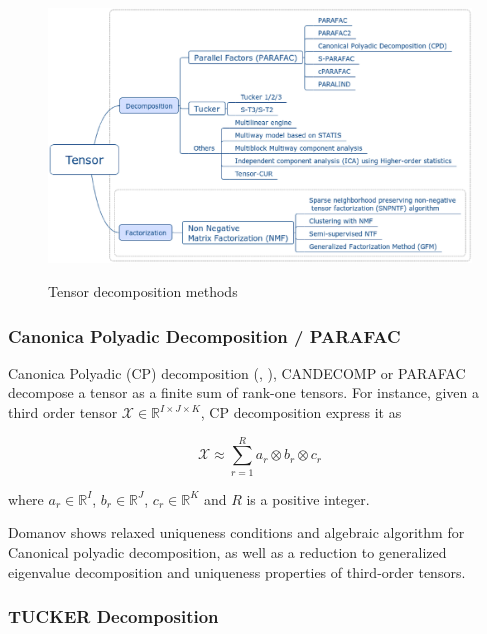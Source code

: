 \documentclass[letterpaper,12pt]{article}
\begin{document}
\begin{figure}[!ht]
\centering
 \includegraphics[scale=0.5]{Images/tensor_decomposition_methods.eps}\label{fig:methods}
 \caption{Tensor decomposition methods}
\end{figure}

\subsubsection{Canonica Polyadic Decomposition / PARAFAC}

Canonica Polyadic (CP) decomposition (\cite{Kolda2009}, \cite{Mocks1988}), CANDECOMP \cite{Carroll1970} or PARAFAC \cite{Harshman1970} decompose a tensor as a finite sum of rank-one tensors. For instance, given a third order tensor $\mathcal{X}\in\mathbb{R}^{I\times J\times K}$, CP decomposition express it as 

\begin{equation}
 \mathcal{X}\approx \sum_{r=1}^{R}a_r\otimes b_r \otimes c_r
\end{equation}\label{eq:cp}

where $a_r\in\mathbb{R}^I$, $b_r\in\mathbb{R}^J$, $c_r\in\mathbb{R}^K$ and $R$ is a positive integer.



Domanov \cite{Domanov2015} shows relaxed uniqueness conditions and algebraic algorithm for Canonical polyadic decomposition, as well as a reduction to generalized eigenvalue decomposition \cite{Domanov2014} and uniqueness properties \cite{Domanov2013} of third-order tensors.


\subsubsection{TUCKER Decomposition}
\end{document}
